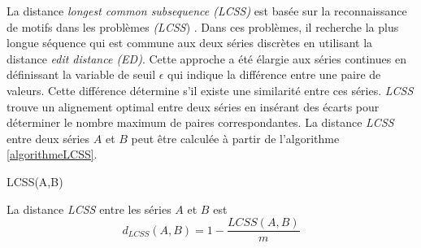La distance {\em longest common subsequence (LCSS)} est bas\'ee sur la reconnaissance de motifs dans les probl\`emes {\em (LCSS}) . Dans ces probl\`emes, il recherche la plus longue s\'equence qui est commune aux deux s\'eries discr\`etes en utilisant la distance {\em edit distance (ED)}.
Cette approche a \'et\'e \'elargie aux s\'eries continues en d\'efinissant la variable de seuil $\epsilon$ qui indique la diff\'erence entre une paire de valeurs. Cette diff\'erence d\'etermine s'il existe une similarit\'e entre ces s\'eries. 
{\em LCSS} trouve un alignement optimal entre deux s\'eries en ins\'erant des \'ecarts pour d\'eterminer le nombre maximum de paires correspondantes.
La distance {\em LCSS} entre deux s\'eries $A$ et $B$ peut \^etre calcul\'ee \`a partir de l'algorithme \ref{algorithmeLCSS}.
 
\begin{algorithm}
\caption{LCSS(A,B)}
\label{algorithmeLCSS}
\begin{algorithmic}[1]
		\ENDIF
	\ENDFOR
\ENDFOR
{}
\end{algorithmic}
\end{algorithm}

La distance {\em LCSS} entre les s\'eries $A$ et $B$ est 
$$
d_{LCSS}(A,B) = 1 - \frac{LCSS(A,B)}{m}
$$
